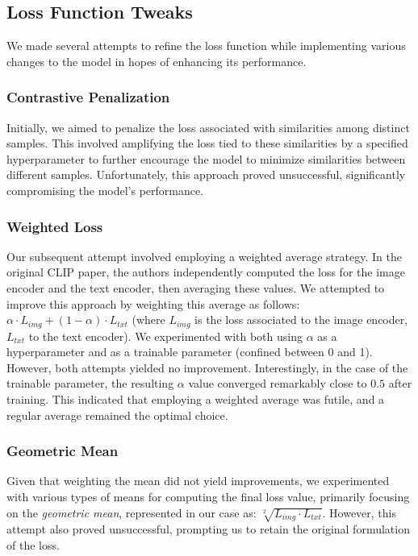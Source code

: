 \documentclass[10pt,twocolumn,letterpaper]{article}
\begin{document}
\subsection{Loss Function Tweaks}
We made several attempts to refine the loss function while implementing various changes to the model in hopes of enhancing its performance.

\subsubsection{Contrastive Penalization}
Initially, we aimed to penalize the loss associated with similarities among distinct samples. This involved amplifying the loss tied to these similarities by a specified hyperparameter to further encourage the model to minimize similarities between different samples. Unfortunately, this approach proved unsuccessful, significantly compromising the model's performance.

\subsubsection{Weighted Loss}
Our subsequent attempt involved employing a weighted average strategy. In the original CLIP paper, the authors independently computed the loss for the image encoder and the text encoder, then averaging these values. We attempted to improve this approach by weighting this average as follows: $\alpha \cdot L_{img} + (1 - \alpha) \cdot L_{txt}$ (where $L_{img}$ is the loss associated to the image encoder, $L_{txt}$ to the text encoder). We experimented with both using $\alpha$ as a hyperparameter and as a trainable parameter (confined between 0 and 1). However, both attempts yielded no improvement. Interestingly, in the case of the trainable parameter, the resulting $\alpha$ value converged remarkably close to $0.5$ after training. This indicated that employing a weighted average was futile, and a regular average remained the optimal choice.


\subsubsection{Geometric Mean}
Given that weighting the mean did not yield improvements, we experimented with various types of means for computing the final loss value, primarily focusing on the \textit{geometric mean}, represented in our case as: $\sqrt[2]{L_{img} \cdot L_{txt}}$. However, this attempt also proved unsuccessful, prompting us to retain the original formulation of the loss.
\end{document}

